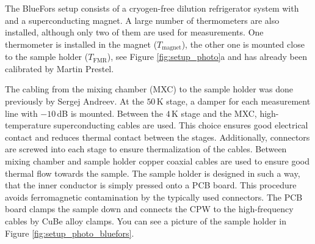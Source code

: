 The BlueFors setup consists of a cryogen-free dilution refrigerator system with and a superconducting magnet. A large number of thermometers are also installed, although only two of them are used for measurements. One thermometer is installed in the magnet ($T_\text{magnet}$), the other one is mounted close to the sample holder ($T_\text{FMR}$), see Figure \ref{fig:setup_photo}a and has already been calibrated by Martin Prestel.

The cabling from the mixing chamber (MXC) to the sample holder was done previously by Sergej Andreev. At the $50\,$K stage, a damper for each measurement line with $-10\,$dB is mounted. Between the $4\,$K stage and the MXC, high-temperature superconducting cables are used. This choice ensures good electrical contact and reduces thermal contact between the stages. Additionally, connectors are screwed into each stage to ensure thermalization of the cables. Between mixing chamber and sample holder copper coaxial cables are used to ensure good thermal flow towards the sample. The sample holder is designed in such a way, that the inner conductor is simply pressed onto a PCB board. This procedure avoids ferromagnetic contamination by the typically used connectors. The PCB board clamps the sample down and connects the CPW to the high-frequency cables by CuBe alloy clamps. You can see a picture of the sample holder in Figure \ref{fig:setup_photo_bluefors}.
